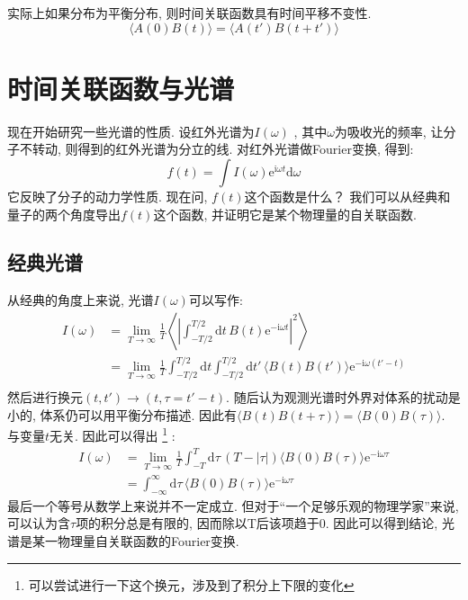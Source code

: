     实际上如果分布为平衡分布, 则时间关联函数具有时间平移不变性. 
    \begin{equation}
        \langle A(0)B(t) \rangle = \langle A(t')B(t+t') \rangle
    \end{equation}
    \section{时间关联函数与光谱}

    现在开始研究一些光谱的性质. 设红外光谱为$I(\omega)$
    , 其中$\omega$为吸收光的频率, 让分子不转动, 则得到的红外光谱为分立的线. 
    对红外光谱做Fourier变换, 得到: 
    \begin{equation}
        f(t) = \int I(\omega)\mathrm{e}^{\mathrm{i}\omega t}\mathrm{d}\omega 
    \end{equation}
    它反映了分子的动力学性质. 现在问, $f(t)$这个函数是什么？
    我们可以从经典和量子的两个角度导出$f(t)$这个函数, 并证明它是某个物理量的自关联函数. 

    \subsection{经典光谱}
    从经典的角度上来说, 光谱$I(\omega)$可以写作:
    \begin{equation}
        \begin{aligned}
            I(\omega) 
            &= \lim_{T\to\infty} \frac 1T \left\langle \left| \int_{-T/2}^{T/2} \mathrm{d}t\, B(t) \mathrm{e}^{-\mathrm{i}\omega t} \right|^2 \right\rangle \\
            &= \lim_{T\to\infty} \frac 1T \int_{-T/2}^{T/2} \mathrm{d}t \int_{-T/2}^{T/2} \mathrm{d}t'\, \langle B(t)B(t') \rangle \mathrm{e}^{-\mathrm{i}\omega (t'-t)} \\
        \end{aligned}
    \end{equation}
    然后进行换元$(t,t')\to(t, \tau=t'-t)$. 随后认为观测光谱时外界对体系的扰动是小的, 
    体系仍可以用平衡分布描述. 因此有$\langle B(t)B(t+\tau) \rangle = \langle B(0)B(\tau) \rangle$. 
    与变量$t$无关. 因此可以得出
    \footnote{可以尝试进行一下这个换元，涉及到了积分上下限的变化}
    : 
    \begin{equation}\begin{aligned}
        I(\omega) 
        &= \lim_{T\to\infty} \frac 1T \int_{-T}^{T} \mathrm{d}\tau\, (T - |\tau|) \langle B(0)B(\tau) \rangle \mathrm{e}^{-\mathrm{i}\omega \tau} \\
        &= \int_{-\infty}^{\infty} \mathrm{d}\tau\, \langle B(0)B(\tau) \rangle \mathrm{e}^{-\mathrm{i}\omega \tau}
    \end{aligned}\end{equation}
    最后一个等号从数学上来说并不一定成立. 但对于“一个足够乐观的物理学家”来说, 可以认为含$\tau$项的积分总是有限的, 因而除以T后该项趋于0. 因此可以得到结论, 光谱是某一物理量自关联函数的Fourier变换.

